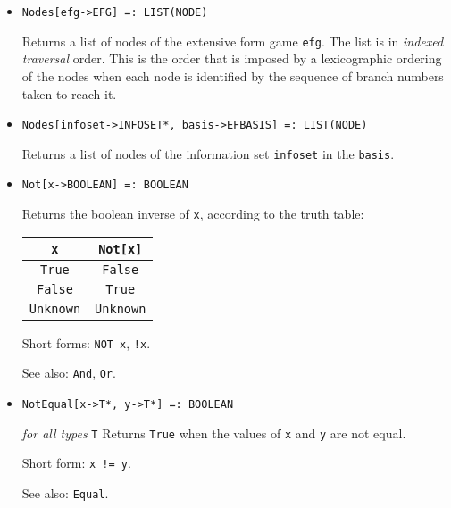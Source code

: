 \begin{itemize}
\item{}
\protect \large \begin{verbatim}
Nodes[efg->EFG] =: LIST(NODE) 
\end{verbatim}\normalsize

\bd
Returns a list of nodes of the extensive form game \verb+efg+.  The
list is in {\it indexed traversal} order.  This is the order that is
imposed by a lexicographic ordering of the nodes when each node is
identified by the sequence of branch numbers taken to reach it.  
\ed

\item{}
\protect \large \begin{verbatim}
Nodes[infoset->INFOSET*, basis->EFBASIS] =: LIST(NODE) 
\end{verbatim}\normalsize

\bd
Returns a list of nodes of the information set \verb+infoset+ in the
\verb+basis+.  
\ed

\item{}
\protect \large \begin{verbatim}
Not[x->BOOLEAN] =: BOOLEAN 
\end{verbatim}\normalsize

\bd
Returns the boolean inverse of \verb+x+, according to the truth table:
\begin{center}
\begin{tabular}{|c|c|}  \hline
\verb+x+ & \verb+Not[x]+ \\ \hline
\verb+True+ & \verb+False+ \\
\verb+False+ & \verb+True+ \\
\verb+Unknown+ & \verb+Unknown+ \\ \hline
\end{tabular}
\end{center}

\item [Short forms:] \verb+NOT x+, \verb+!x+.
\item [See also:] \verb+And+, \verb+Or+.
\ed

\item{}
\protect \large \begin{verbatim}
NotEqual[x->T*, y->T*] =: BOOLEAN
\end{verbatim}\normalsize

{\it for all types} {\tt T}
\bd
Returns \verb+True+ when the values of \verb+x+ and \verb+y+ are
not equal.
\item [Short form:] \verb+x != y+.
\item [See also:] \verb+Equal+.
\ed


\end{itemize}
